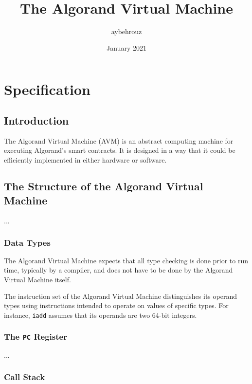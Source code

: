 \documentclass[11pt, A4]{report}
\title{The Algorand Virtual Machine}
\author{aybehrouz}
\date{January 2021}
\begin{document}
    \maketitle


    \chapter{Specification}\label{ch:specification}


    \section{Introduction}\label{sec:introduction}

    The Algorand Virtual Machine (AVM) is an abstract computing machine for executing Algorand's smart contracts. It
    is designed in a way that it could be efficiently implemented in either hardware or software.


    \section{The Structure of the Algorand Virtual Machine}\label{sec:the-structure-of-the-algorand-virtual-machine}

    ...

    \subsection{Data Types}\label{subsec:data-types}

    The Algorand Virtual Machine expects that all type checking is done prior to run time, typically by a compiler,
    and does not have to be done by the Algorand Virtual Machine itself.

    The instruction set of the Algorand Virtual Machine distinguishes its operand types using instructions intended to
    operate on values of specific types. For instance, \texttt{iadd} assumes that its operands are two 64-bit integers.

    \subsection{The \texttt{PC} Register}\label{subsec:the-pc-register}

    ...

    \subsection{Call Stack}\label{subsec:call-stack}
\end{document}
